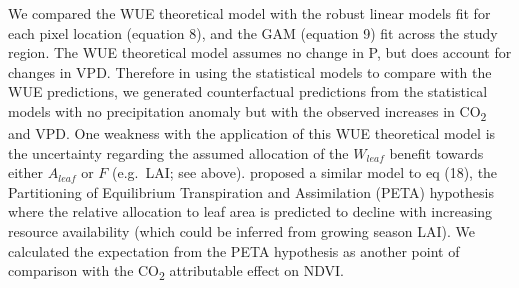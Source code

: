 \documentclass[gc, manuscript]{copernicus}
\begin{document}
We compared the WUE theoretical model with the robust linear models fit
for each pixel location (equation 8), and the GAM (equation 9) fit
across the study region. The WUE theoretical model assumes no change in
P, but does account for changes in VPD. Therefore in using the
statistical models to compare with the WUE predictions, we generated
counterfactual predictions from the statistical models with no
precipitation anomaly but with the observed increases in
CO\textsubscript{2} and VPD. One weakness with the application of this
WUE theoretical model is the uncertainty regarding the assumed
allocation of the \(W_{leaf}\) benefit towards either \(A_{leaf}\) or
\(F\) (e.g.~LAI; see above). \citep{donohue_etal17} proposed a similar
model to eq (18), the Partitioning of Equilibrium Transpiration and
Assimilation (PETA) hypothesis where the relative allocation to leaf
area is predicted to decline with increasing resource availability
(which could be inferred from growing season LAI). We calculated the
expectation from the PETA hypothesis as another point of comparison with
the CO\textsubscript{2} attributable effect on NDVI.
\end{document}
